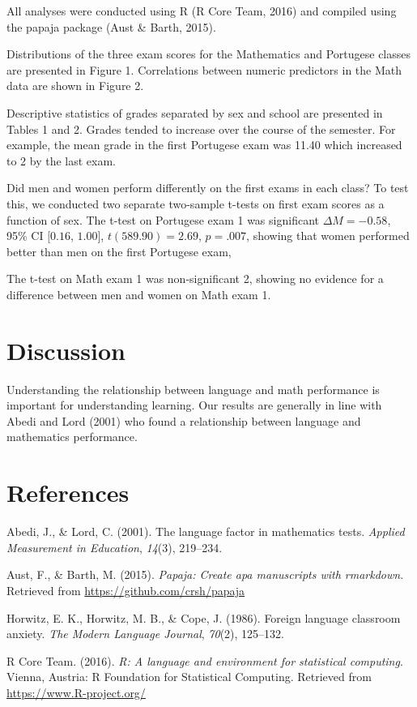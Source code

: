 \documentclass[english,floatsintext,man]{apa6}
\theoremstyle{definition}
\theoremstyle{definition}
\theoremstyle{definition}
\theoremstyle{remark}
\begin{document}
All analyses were conducted using R (R Core Team, 2016) and compiled
using the papaja package (Aust \& Barth, 2015).

Distributions of the three exam scores for the Mathematics and Portugese
classes are presented in Figure 1. Correlations between numeric
predictors in the Math data are shown in Figure 2.

Descriptive statistics of grades separated by sex and school are
presented in Tables 1 and 2. Grades tended to increase over the course
of the semester. For example, the mean grade in the first Portugese exam
was 11.40 which increased to 2 by the last exam.

Did men and women perform differently on the first exams in each class?
To test this, we conducted two separate two-sample t-tests on first exam
scores as a function of sex. The t-test on Portugese exam 1 was
significant \(\Delta M = -0.58\), 95\% CI \([0.16\), \(1.00]\),
\(t(589.90) = 2.69\), \(p = .007\), showing that women performed better
than men on the first Portugese exam,

The t-test on Math exam 1 was non-significant 2, showing no evidence for
a difference between men and women on Math exam 1.

\section{Discussion}\label{discussion}

Understanding the relationship between language and math performance is
important for understanding learning. Our results are generally in line
with Abedi and Lord (2001) who found a relationship between language and
mathematics performance.

\section{References}\label{references}

\setlength{\parindent}{-0.5in} \setlength{\leftskip}{0.5in}
\setlength{\parskip}{8pt}

\hypertarget{refs}{}
\hypertarget{ref-abedi2001language}{}
Abedi, J., \& Lord, C. (2001). The language factor in mathematics tests.
\emph{Applied Measurement in Education}, \emph{14}(3), 219--234.

\hypertarget{ref-aust2015papaja}{}
Aust, F., \& Barth, M. (2015). \emph{Papaja: Create apa manuscripts with
rmarkdown}. Retrieved from \url{https://github.com/crsh/papaja}

\hypertarget{ref-horwitz1986foreign}{}
Horwitz, E. K., Horwitz, M. B., \& Cope, J. (1986). Foreign language
classroom anxiety. \emph{The Modern Language Journal}, \emph{70}(2),
125--132.

\hypertarget{ref-R}{}
R Core Team. (2016). \emph{R: A language and environment for statistical
computing}. Vienna, Austria: R Foundation for Statistical Computing.
Retrieved from \url{https://www.R-project.org/}
\end{document}
